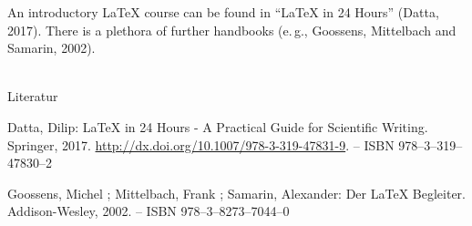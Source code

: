 
An introductory \LaTeX{} course can be found in \enquote{\LaTeX{} in 24 Hours} (Datta, 2017).
There is a plethora of further handbooks (e.\,g., Goossens, Mittelbach and Samarin, 2002).

~\\

\noindent Literatur

\noindent [Datta 2017] Datta, Dilip: LaTeX in 24 Hours - A Practical Guide for Scientific Writing. Springer, 2017. \url{http://dx.doi.org/10.1007/978-3-319-47831-9}. – ISBN 978–3–319–47830–2

\noindent [Goossens u. a. 2002] Goossens, Michel ; Mittelbach, Frank ; Samarin, Alexander: Der LaTeX Begleiter. Addison-Wesley, 2002. – ISBN 978–3–8273–7044–0
